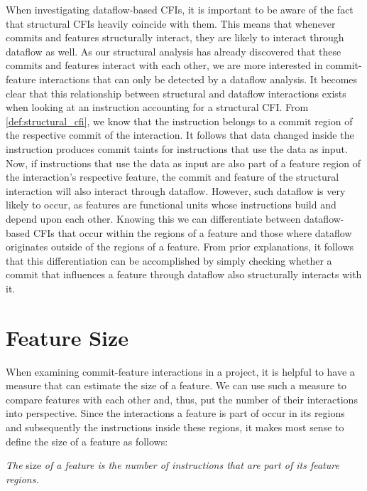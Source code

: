 When investigating dataflow-based CFIs, it is important to be aware of the fact that structural CFIs heavily coincide with them.
This means that whenever commits and features structurally interact, they are likely to interact through dataflow as well.
As our structural analysis has already discovered that these commits and features interact with each other, 
we are more interested in commit-feature interactions that can only be detected by a dataflow analysis.
It becomes clear that this relationship between structural and dataflow interactions exists when looking at an instruction accounting for a structural CFI.
From \autoref{def:structural_cfi}, we know that the instruction belongs to a commit region of the respective commit of the interaction.
It follows that data changed inside the instruction produces commit taints for instructions that use the data as input. 
Now, if instructions that use the data as input are also part of a feature region of the interaction's respective feature, the commit and feature of the structural interaction will also interact through dataflow.
However, such dataflow is very likely to occur, as features are functional units whose instructions build and depend upon each other. 
Knowing this we can differentiate between dataflow-based CFIs that occur within the regions of a feature and those where dataflow originates outside of the regions of a feature.
From prior explanations, it follows that this differentiation can be accomplished by simply checking whether a commit that influences a feature through dataflow also structurally interacts with it. 

\section{Feature Size}\label{sec:feature_size}

When examining commit-feature interactions in a project, it is helpful to have a measure that can estimate the size of a feature.
We can use such a measure to compare features with each other and, thus, put the number of their interactions into perspective.
Since the interactions a feature is part of occur in its regions and subsequently the instructions inside these regions, it makes most sense to define the size of a feature as follows:
\begin{definition}\label{def:feature_size}
\emph{The} size \emph{of a feature is the number of instructions that are part of its feature regions.}
\end{definition}

